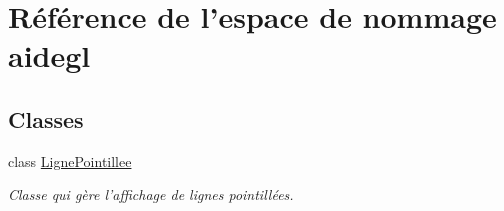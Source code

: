 \hypertarget{namespaceaidegl}{\section{Référence de l'espace de nommage aidegl}
\label{namespaceaidegl}
}
\subsection*{Classes}
\begin{DoxyCompactItemize}
\item 
class \hyperlink{classaidegl_1_1_ligne_pointillee}{Ligne\-Pointillee}
\begin{DoxyCompactList}\small\item\em Classe qui gère l'affichage de lignes pointillées. \end{DoxyCompactList}\end{DoxyCompactItemize}
